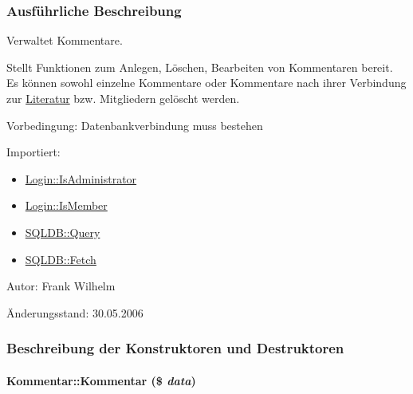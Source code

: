 \subsubsection{Ausf\"{u}hrliche Beschreibung}
Verwaltet Kommentare. 

Stellt Funktionen zum Anlegen, Löschen, Bearbeiten von Kommentaren bereit. Es können sowohl einzelne Kommentare oder Kommentare nach ihrer Verbindung zur \hyperlink{classLiteratur}{Literatur} bzw. Mitgliedern gelöscht werden. \begin{Desc}
\item[Vorbedingung:]Datenbankverbindung muss bestehen \end{Desc}
\begin{Desc}
\item[Importiert:]\begin{itemize}
\item \hyperlink{classLogin_6c120224aa6719f58c6ccd08acc28758}{Login::Is\-Administrator}\item \hyperlink{classLogin_70d2747b0aa454f4203a789afea25318}{Login::Is\-Member}\item \hyperlink{classSQLDB_fc6ffa8df50f68f07d9f5e3385b96d7a}{SQLDB::Query}\item \hyperlink{classSQLDB_a55c00ce1de0e50e0a58cae61892ba35}{SQLDB::Fetch}\end{itemize}
\end{Desc}
\begin{Desc}
\item[Autor:]Frank Wilhelm \end{Desc}
\begin{Desc}
\item[Änderungsstand:]30.05.2006 \end{Desc}




\subsubsection{Beschreibung der Konstruktoren und Destruktoren}
\hypertarget{classKommentar_ea774e2108c754890c602dfdd53d64e1}{
\paragraph[Kommentar]{\setlength{\rightskip}{0pt plus 5cm}Kommentar::Kommentar (\$ {\em data})}\hfill}
\label{classKommentar_ea774e2108c754890c602dfdd53d64e1}


